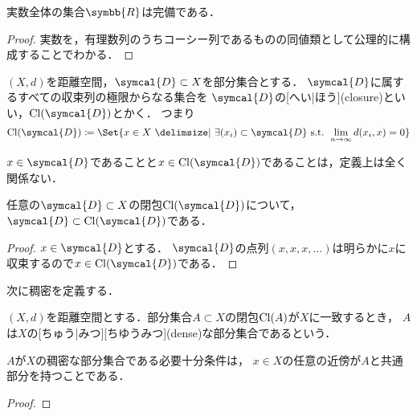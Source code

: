 \documentclass{sotsu}
\begin{document}
\begin{proposition}[実数の完備性]
    実数全体の集合$\symbb{R}$は完備である．
\end{proposition}

\begin{proof}
    実数を，有理数列のうちコーシー列であるものの同値類として公理的に構成することでわかる．
\end{proof}

\begin{definition}[閉包]
    \label{dfn:closure-by-sequence}
    $(X, d)$を距離空間，$\symcal{D} \subset X$を部分集合とする．
    $\symcal{D}$に属するすべての収束列の極限からなる集合を
    $\symcal{D}$の[へい|ほう](closure)といい，$\cl{\symcal{D}}$とかく．
    つまり
    \begin{equation}
        \cl{\symcal{D}} \coloneq \Set{ x \in X  \given  \exists (x_i) \subset \symcal{D} \text{ s.t. } \lim_{n \to \infty} d(x_i, x) = 0 }
    \end{equation}
\end{definition}

$x \in \symcal{D}$であることと$x \in \cl{\symcal{D}}$であることは，定義上は全く関係ない．

\begin{corollary}
    任意の$\symcal{D} \subset X$の閉包$\cl{\symcal{D}}$について，
    $\symcal{D} \subset \cl{\symcal{D}}$である．
\end{corollary}

\begin{proof}
    $x \in \symcal{D}$とする．
    $\symcal{D}$の点列$(x, x, x, \dotsc)$は明らかに$x$に収束するので$x \in \cl{\symcal{D}}$である．
\end{proof}

次に稠密を定義する．

\begin{definition}[稠密]
    $(X, d)$を距離空間とする．部分集合$A \subset X$の閉包$\mathrm{Cl}(A)$が$X$に一致するとき，
    $A$は$X$の[ちゅう|みつ][ちゆうみつ](dense)な部分集合であるという．
\end{definition}

\begin{corollary}
    $A$が$X$の稠密な部分集合である必要十分条件は，
    $x \in X$の任意の近傍が$A$と共通部分を持つことである．
\end{corollary}

\begin{proof}
    
\end{proof}
\end{document}
